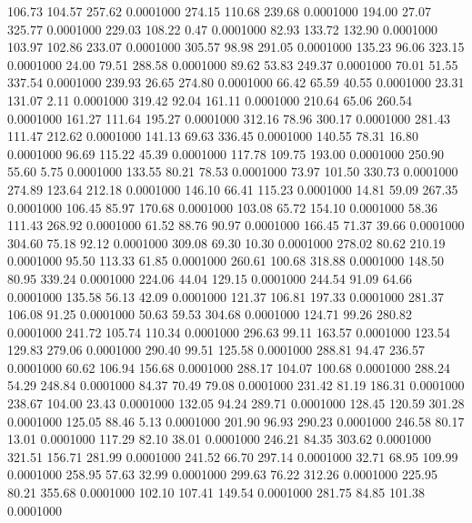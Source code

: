  106.73  104.57  257.62   0.0001000
 274.15  110.68  239.68   0.0001000
 194.00   27.07  325.77   0.0001000
 229.03  108.22    0.47   0.0001000
  82.93  133.72  132.90   0.0001000
 103.97  102.86  233.07   0.0001000
 305.57   98.98  291.05   0.0001000
 135.23   96.06  323.15   0.0001000
  24.00   79.51  288.58   0.0001000
  89.62   53.83  249.37   0.0001000
  70.01   51.55  337.54   0.0001000
 239.93   26.65  274.80   0.0001000
  66.42   65.59   40.55   0.0001000
  23.31  131.07    2.11   0.0001000
 319.42   92.04  161.11   0.0001000
 210.64   65.06  260.54   0.0001000
 161.27  111.64  195.27   0.0001000
 312.16   78.96  300.17   0.0001000
 281.43  111.47  212.62   0.0001000
 141.13   69.63  336.45   0.0001000
 140.55   78.31   16.80   0.0001000
  96.69  115.22   45.39   0.0001000
 117.78  109.75  193.00   0.0001000
 250.90   55.60    5.75   0.0001000
 133.55   80.21   78.53   0.0001000
  73.97  101.50  330.73   0.0001000
 274.89  123.64  212.18   0.0001000
 146.10   66.41  115.23   0.0001000
  14.81   59.09  267.35   0.0001000
 106.45   85.97  170.68   0.0001000
 103.08   65.72  154.10   0.0001000
  58.36  111.43  268.92   0.0001000
  61.52   88.76   90.97   0.0001000
 166.45   71.37   39.66   0.0001000
 304.60   75.18   92.12   0.0001000
 309.08   69.30   10.30   0.0001000
 278.02   80.62  210.19   0.0001000
  95.50  113.33   61.85   0.0001000
 260.61  100.68  318.88   0.0001000
 148.50   80.95  339.24   0.0001000
 224.06   44.04  129.15   0.0001000
 244.54   91.09   64.66   0.0001000
 135.58   56.13   42.09   0.0001000
 121.37  106.81  197.33   0.0001000
 281.37  106.08   91.25   0.0001000
  50.63   59.53  304.68   0.0001000
 124.71   99.26  280.82   0.0001000
 241.72  105.74  110.34   0.0001000
 296.63   99.11  163.57   0.0001000
 123.54  129.83  279.06   0.0001000
 290.40   99.51  125.58   0.0001000
 288.81   94.47  236.57   0.0001000
  60.62  106.94  156.68   0.0001000
 288.17  104.07  100.68   0.0001000
 288.24   54.29  248.84   0.0001000
  84.37   70.49   79.08   0.0001000
 231.42   81.19  186.31   0.0001000
 238.67  104.00   23.43   0.0001000
 132.05   94.24  289.71   0.0001000
 128.45  120.59  301.28   0.0001000
 125.05   88.46    5.13   0.0001000
 201.90   96.93  290.23   0.0001000
 246.58   80.17   13.01   0.0001000
 117.29   82.10   38.01   0.0001000
 246.21   84.35  303.62   0.0001000
 321.51  156.71  281.99   0.0001000
 241.52   66.70  297.14   0.0001000
  32.71   68.95  109.99   0.0001000
 258.95   57.63   32.99   0.0001000
 299.63   76.22  312.26   0.0001000
 225.95   80.21  355.68   0.0001000
 102.10  107.41  149.54   0.0001000
 281.75   84.85  101.38   0.0001000
